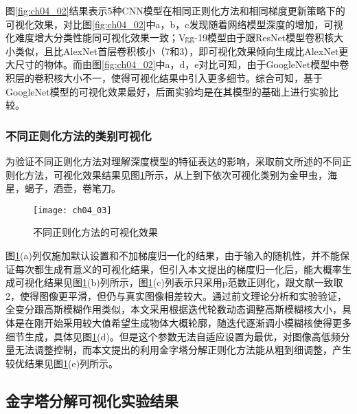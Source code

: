 图\ref{fig:ch04_02}结果表示5种CNN模型在相同正则化方法和相同梯度更新策略下的可视化效果，对比图\ref{fig:ch04_02}中a，b，c发现随着网络模型深度的增加，可视化难度增大分类性能同可视化效果一致；Vgg-19模型由于跟ResNet模型卷积核大小类似，且比AlexNet首层卷积核小（7和3），即可视化效果倾向生成比AlexNet更大尺寸的物体。而由图\ref{fig:ch04_02}中a，d，e对比可知，由于GoogleNet模型中卷积层的卷积核大小不一，使得可视化结果中引入更多细节。综合可知，基于GoogleNet模型的可视化效果最好，后面实验均是在其模型的基础上进行实验比较。

\subsubsection{ 不同正则化方法的类别可视化}
为验证不同正则化方法对理解深度模型的特征表达的影响，采取前文所述的不同正则化方法，可视化效果结果见图\ref{fig:ch04_03}所示，从上到下依次可视化类别为金甲虫，海星，蝎子，酒壶，卷笔刀。
 
\begin{figure}[!htbp]
\centering
\texttt{[image: ch04\_03]}
\caption{不同正则化方法的可视化效果}
\label{fig:ch04_03}
\end{figure}

图\ref{fig:ch04_03}(a)列仅施加默认设置和不加梯度归一化的结果，由于输入的随机性，并不能保证每次都生成有意义的可视化结果，但引入本文提出的梯度归一化后，能大概率生成可视化结果见图\ref{fig:ch04_03}(b)列所示，图\ref{fig:ch04_03}(c)列表示只采用p范数正则化，跟文献一致取2，使得图像更平滑，但仍与真实图像相差较大。通过前文理论分析和实验验证，全变分跟高斯模糊作用类似，本文采用根据迭代轮数动态调整高斯模糊核大小，具体是在刚开始采用较大值希望生成物体大概轮廓，随迭代逐渐调小模糊核使得更多细节生成，具体见图\ref{fig:ch04_03}(d)。但是这个参数无法自适应设置为最优，对图像高低频分量无法调整控制，而本文提出的利用金字塔分解正则化方法能从粗到细调整，产生较优结果见图\ref{fig:ch04_03}(e)列所示。

\subsection{金字塔分解可视化实验结果}

